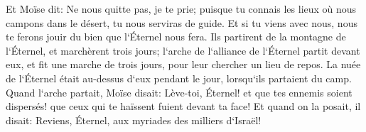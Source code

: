 \verse Et Moïse dit: Ne nous quitte pas, je te prie; puisque tu connais les lieux où nous campons dans le désert, tu nous serviras de guide. 
\verse Et si tu viens avec nous, nous te ferons jouir du bien que l`Éternel nous fera. 
\verse Ils partirent de la montagne de l`Éternel, et marchèrent trois jours; l`arche de l`alliance de l`Éternel partit devant eux, et fit une marche de trois jours, pour leur chercher un lieu de repos. 
\verse La nuée de l`Éternel était au-dessus d`eux pendant le jour, lorsqu`ils partaient du camp. 
\verse Quand l`arche partait, Moïse disait: Lève-toi, Éternel! et que tes ennemis soient dispersés! que ceux qui te haïssent fuient devant ta face! 
\verse Et quand on la posait, il disait: Reviens, Éternel, aux myriades des milliers d`Israël! 

